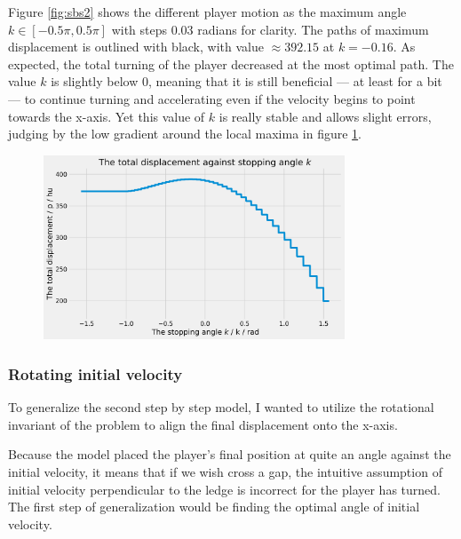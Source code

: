 Figure \ref{fig:sbs2} shows the different player motion as the maximum angle $k\in [-0.5\pi, 0.5\pi]$ with steps $0.03$ radians for clarity. The paths of maximum displacement is outlined with black, with value $\approx 392.15$ at $k=-0.16$. As expected, the total turning of the player decreased at the most optimal path. The value $k$ is slightly below $0$, meaning that it is still beneficial --- at least for a bit --- to continue turning and accelerating even if the velocity begins to point towards the x-axis. Yet this value of $k$ is really stable and allows slight errors, judging by the low gradient around the local maxima in figure \ref{fig:sbs2k}.

\begin{figure}[H]
    \centering
    \includegraphics[width=0.8\textwidth]{assets/step_by_step_2k.png}
    \caption{}
    \label{fig:sbs2k}
\end{figure}


\subsubsection{Rotating initial velocity}
To generalize the second step by step model, I wanted to utilize the rotational invariant of the problem to align the final displacement onto the x-axis.

Because the model placed the player's final position at quite an angle against the initial velocity, it means that if we wish cross a gap, the intuitive assumption of initial velocity perpendicular to the ledge is incorrect for the player has turned. The first step of generalization would be finding the optimal angle of initial velocity.


